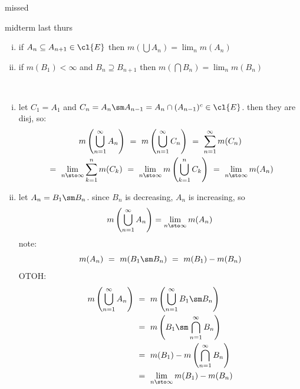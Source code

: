 \newpage
{}
missed

midterm last thurs

\begin{thm}\vspace{-0.2in}
	\begin{enumerate}[i)]
		\item if $A_{n}\subseteq A_{n+1}\in\cl{E}$ then
			$m\left(\bigcup A_{n}\right)=\lim_{n}m(A_{n})$
		\item if $m(B_{1})<\infty$ and $B_{n}\supseteq B_{n+1}$ then
			$m\left(\bigcap B_{n}\right)=\lim_{n}m(B_{n})$
	\end{enumerate}
\end{thm} \

\begin{pf} \vspace{-0.2in}
	\begin{enumerate}[i)]
		\item let $C_{1}=A_{1}$ and $C_{n}=A_{n}\sm A_{n-1}=A_{n}\cap(A_{n-1})^{c}\in\cl{E}$.
			then they are disj, so:
			\begin{gather*}
				m\left(\bigcup_{n=1}^{\infty}A_{n}\right)
				\ = \ m\left(\bigcup_{n=1}^{\infty}C_{n}\right)
				\ = \ \sum_{n=1}^{\infty}m(C_{n}) \\
				\ = \ \lim_{n\sto\infty}\sum_{k=1}^{n}m(C_{k})
				\ = \ \lim_{n\sto\infty}m\left(\bigcup_{k=1}^{n}C_{k}\right)
				\ = \ \lim_{n\sto\infty}m(A_{n})
			\end{gather*}
		\item let $A_{n}=B_{1}\sm B_{n}$.
			since $B_{n}$ is decreasing, $A_{n}$ is increasing, so
			\begin{equation*}
				m\left(\bigcup_{n=1}^{\infty}A_{n}\right)=\lim_{n\sto\infty}m(A_{n})
			\end{equation*}
			note:
			\begin{equation*}
				m(A_{n}) \ = \ m(B_{1}\sm B_{n}) \ = \ m(B_{1})-m(B_{n})
			\end{equation*}
			OTOH:
			\begin{align*}
				m\left(\bigcup_{n=1}^{\infty}A_{n}\right)
				& \ = \ m\left(\bigcup_{n=1}^{\infty}B_{1}\sm B_{n}\right) \\
				& \ = \ m\left(B_{1}\sm \bigcap_{n=1}^{\infty}B_{n}\right) \\
				& \ = \ m(B_{1})-m\left(\bigcap_{n=1}^{\infty}B_{n}\right) \\
				& \ = \ \lim_{n\sto\infty}m(B_{1})-m(B_{n})
			\end{align*}
	\end{enumerate}
\end{pf}

